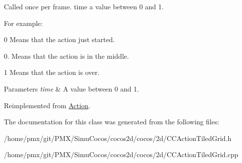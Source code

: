 Called once per frame. time a value between 0 and 1.

For example\+:
\begin{DoxyItemize}
\item 0 Means that the action just started.
\item 0. Means that the action is in the middle.
\item 1 Means that the action is over.
\end{DoxyItemize}


\begin{DoxyParams}{Parameters}
{\em time} & A value between 0 and 1. \\
\hline
\end{DoxyParams}


Reimplemented from \hyperlink{classAction_a937e646e63915e33ad05ba149bfcf239}{Action}.



The documentation for this class was generated from the following files\+:\begin{DoxyCompactItemize}
\item 
/home/pmx/git/\+P\+M\+X/\+Simu\+Cocos/cocos2d/cocos/2d/C\+C\+Action\+Tiled\+Grid.\+h\item 
/home/pmx/git/\+P\+M\+X/\+Simu\+Cocos/cocos2d/cocos/2d/C\+C\+Action\+Tiled\+Grid.\+cpp\end{DoxyCompactItemize}
